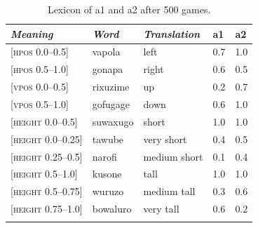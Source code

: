 \begin{table}
\begin{center}
\begin{tabular}{ l  l  l  l  l }
\lsptoprule
{\itshape Meaning}&{\itshape Word}&{\itshape Translation} & {\bfshape  a1}&{\bfshape  a2} \\ \midrule
{}[\textsc{hpos} 0.0–0.5]&vapola&left &0.7&1.0\\ 
{}[\textsc{hpos} 0.5–1.0]&gonapa&right &0.6&0.5\\ 
{}[\textsc{vpos} 0.0–0.5]&rixuzime& up & 0.2&0.7\\ 
{}[\textsc{vpos} 0.5–1.0]&gofugage& down &0.6&1.0\\ 
{}[\textsc{height} 0.0–0.5]&suwaxugo&short & 1.0&1.0\\ 
{}[\textsc{height} 0.0–0.25]&tawube&very short & 0.4&0.5\\ 
{}[\textsc{height} 0.25–0.5]&narofi&medium short&0.1&0.4\\ 
{}[\textsc{height} 0.5–1.0]&kusone&tall&1.0&1.0\\ 
{}[\textsc{height} 0.5–0.75]&wuruzo&medium tall&0.3&0.6\\ 
{}[\textsc{height} 0.75–1.0]&bowaluro&very tall&0.6&0.2\\ 
\lspbottomrule
\end{tabular}
\caption{\label{tab:lex500a}Lexicon of {\bfshape  a1} and {\bfshape  a2} after 500 games.}
\end{center}
\end{table}



